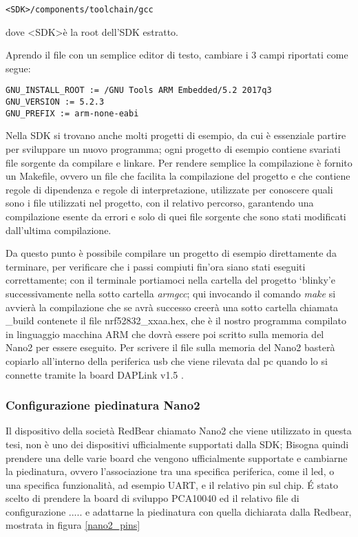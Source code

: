 \begin{verbatim}
<SDK>/components/toolchain/gcc
\end{verbatim}
dove \textless SDK\textgreater  è la root dell'SDK estratto.

Aprendo il file con un semplice editor di testo, cambiare i 3 campi riportati come segue:

\begin{verbatim}
GNU_INSTALL_ROOT := /GNU Tools ARM Embedded/5.2 2017q3  
GNU_VERSION := 5.2.3  
GNU_PREFIX := arm-none-eabi
\end{verbatim}

Nella SDK si trovano anche molti progetti di esempio, da cui è essenziale partire per sviluppare un nuovo programma; ogni progetto di esempio contiene svariati file sorgente da compilare e linkare. Per rendere semplice la compilazione è fornito un Makefile, ovvero un file che facilita la compilazione del progetto e che contiene regole di dipendenza e regole di interpretazione, utilizzate per conoscere quali sono i file utilizzati nel progetto, con il relativo percorso, garantendo una compilazione esente da errori e solo di quei file sorgente che sono stati modificati dall'ultima compilazione.

Da questo punto è possibile compilare un progetto di esempio direttamente da terminare, per verificare che i passi compiuti fin'ora siano stati eseguiti correttamente; con il terminale portiamoci nella cartella del progetto \lq blinky\rq e successivamente nella sotto cartella \emph{armgcc}; qui invocando il comando \emph{make} si avvierà la compilazione che se avrà successo creerà una sotto cartella chiamata \_build contenete il file nrf52832\_xxaa.hex, che è il nostro programma compilato in linguaggio macchina ARM che dovrà essere poi scritto sulla memoria del Nano2 per essere eseguito.
Per scrivere il file sulla memoria del Nano2 basterà copiarlo all'interno della periferica usb che viene rilevata dal pc quando lo si connette tramite la board DAPLink v1.5 .
\subsubsection{Configurazione piedinatura Nano2}
Il dispositivo della società RedBear chiamato Nano2 che viene utilizzato in questa tesi, non è uno dei dispositivi ufficialmente supportati dalla SDK; Bisogna quindi prendere una delle varie board che vengono ufficialmente supportate e cambiarne la piedinatura, ovvero l'associazione tra una specifica periferica, come il led, o una specifica funzionalità, ad esempio UART, e il relativo pin sul chip. 
\'E stato scelto di prendere la board di sviluppo PCA10040 ed il relativo file di configurazione ..... e adattarne la piedinatura con quella dichiarata dalla Redbear, mostrata in figura \ref{nano2_pins}

